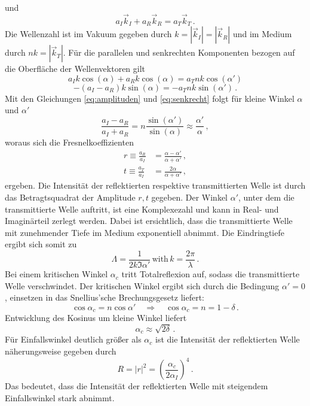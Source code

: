 und
\begin{equation}
    a_I \vec{k}_I + a_R \vec{k}_R = a_T \vec{k}_T \, .
\end{equation}
Die Wellenzahl ist im Vakuum gegeben durch $k=|\vec{k}_I| = |\vec{k}_R |$ und im Medium durch $nk = |\vec{k}_T|$.
Für die parallelen und senkrechten Komponenten bezogen auf die Oberfläche der Wellenvektoren gilt
\begin{equation}
    a_I k \cos(\alpha) + a_R k \cos(\alpha) = a_T nk \cos(\alpha') \label{eq:parallel}
\end{equation}
\begin{equation}
    -(a_I-a_R) k \sin(\alpha) = - a_T nk \sin(\alpha') \, . \label{eq:senkrecht}
\end{equation}
Mit den Gleichungen \eqref{eq:amplituden} und \eqref{eq:senkrecht} folgt für kleine Winkel $\alpha$ und $\alpha'$
\begin{equation}
    \frac{a_I-a_R}{a_I+a_R} = n \frac{\sin(\alpha')}{\sin(\alpha)} \approx \frac{\alpha'}{\alpha} \, ,
\end{equation}
woraus sich die Fresnelkoeffizienten
\begin{align}
    r \equiv \frac{a_R}{a_I} &= \frac{\alpha - \alpha'}{\alpha + \alpha'} \, , \\
    t \equiv \frac{a_T}{a_I} &= \frac{2\alpha}{\alpha + \alpha'} \, ,
\end{align}
ergeben.
Die Intensität der reflektierten respektive transmittierten Welle ist durch das Betragtsquadrat der Amplitude $r,t$ gegeben.
Der Winkel $\alpha'$, unter dem die transmittierte Welle auftritt, ist eine Komplexezahl und kann in Real- und Imaginärteil
zerlegt werden.
Dabei ist ersichtlich, dass die transmittierte Welle mit zunehmender Tiefe im Medium exponentiell abnimmt.
Die Eindringtiefe ergibt sich somit zu 
\begin{equation}
    \Lambda = \frac{1}{2 k \Im \alpha'} \, \text{with} \, k= \frac{2\pi}{\lambda} \, .
\end{equation}
Bei einem kritischen Winkel $\alpha_c$ tritt Totalreflexion auf, sodass die transmittierte Welle verschwindet.
Der kritischen Winkel ergibt sich durch die Bedingung $\alpha' =0$, einsetzen in das Snellius'sche Brechungsgesetz liefert:
\begin{equation}
   \cos \alpha_c = n \cos \alpha' \quad \Rightarrow \quad \cos \alpha_c = n = 1 - \delta \, .
\end{equation}
Entwicklung des Kosinus um kleine Winkel liefert
\begin{equation}
    \alpha_c \approx \sqrt{2 \delta} \, .
    \label{eq:alpha_c}
\end{equation}
Für Einfallswinkel deutlich größer als $\alpha_c$ ist die Intensität der reflektierten Welle näherungsweise gegeben durch
\begin{equation}
    R = |r|^2 = \left(\frac{\alpha_c}{2 \alpha_I} \right)^4 \, .
    \label{eq:reflektivität_R}
\end{equation}
Das bedeutet, dass die Intensität der reflektierten Welle mit steigendem Einfallswinkel stark abnimmt.

